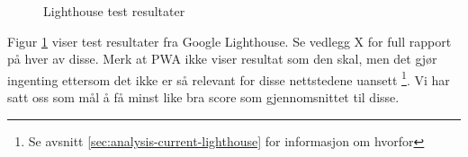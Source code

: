 \begin{figure}[H]
    \begin{center}
        \caption{Lighthouse test resultater}
        \label{fig:competitors-lighthouse-summary}
    \end{center}
\end{figure}

Figur \ref{fig:competitors-lighthouse-summary} viser test resultater fra Google Lighthouse. Se vedlegg X for full rapport på hver av disse. Merk at PWA ikke viser resultat som den skal, men det gjør ingenting ettersom det ikke er så relevant for disse nettstedene uansett \footnote{Se avsnitt \ref{sec:analysis-current-lighthouse} for informasjon om hvorfor}.
Vi har satt oss som mål å få minst like bra score som gjennomsnittet til disse.

\clearpage